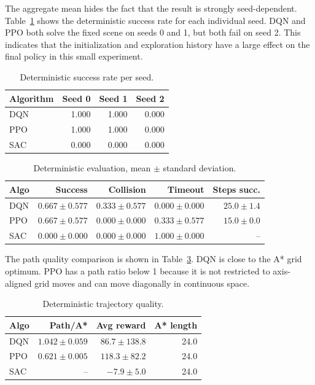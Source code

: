 \documentclass[conference]{IEEEtran}
\begin{document}
The aggregate mean hides the fact that the result is strongly seed-dependent.
Table~\ref{tab:seed_success} shows the deterministic success rate for each
individual seed. DQN and PPO both solve the fixed scene on seeds 0 and 1, but
both fail on seed 2. This indicates that the initialization and exploration
history have a large effect on the final policy in this small experiment.

\begin{table}[htbp]
\caption{Deterministic success rate per seed.}
\label{tab:seed_success}
\centering
\begin{tabular}{lrrr}
\toprule
Algorithm & Seed 0 & Seed 1 & Seed 2 \\
\midrule
DQN & 1.000 & 1.000 & 0.000 \\
PPO & 1.000 & 1.000 & 0.000 \\
SAC & 0.000 & 0.000 & 0.000 \\
\bottomrule
\end{tabular}
\end{table}

\begin{table}[htbp]
\caption{Deterministic evaluation, mean $\pm$ standard deviation.}
\label{tab:det}
\centering
\begin{tabular}{lrrrr}
\toprule
Algo & Success & Collision & Timeout & Steps succ. \\
\midrule
DQN & $0.667 \pm 0.577$ & $0.333 \pm 0.577$ & $0.000 \pm 0.000$ & $25.0 \pm 1.4$ \\
PPO & $0.667 \pm 0.577$ & $0.000 \pm 0.000$ & $0.333 \pm 0.577$ & $15.0 \pm 0.0$ \\
SAC & $0.000 \pm 0.000$ & $0.000 \pm 0.000$ & $1.000 \pm 0.000$ & -- \\
\bottomrule
\end{tabular}
\end{table}

The path quality comparison is shown in Table~\ref{tab:path}. DQN is close to
the A* grid optimum. PPO has a path ratio below 1 because it is not restricted
to axis-aligned grid moves and can move diagonally in continuous space.

\begin{table}[htbp]
\caption{Deterministic trajectory quality.}
\label{tab:path}
\centering
\begin{tabular}{lrrr}
\toprule
Algo & Path/A* & Avg reward & A* length \\
\midrule
DQN & $1.042 \pm 0.059$ & $86.7 \pm 138.8$ & 24.0 \\
PPO & $0.621 \pm 0.005$ & $118.3 \pm 82.2$ & 24.0 \\
SAC & -- & $-7.9 \pm 5.0$ & 24.0 \\
\bottomrule
\end{tabular}
\end{table}
\end{document}
